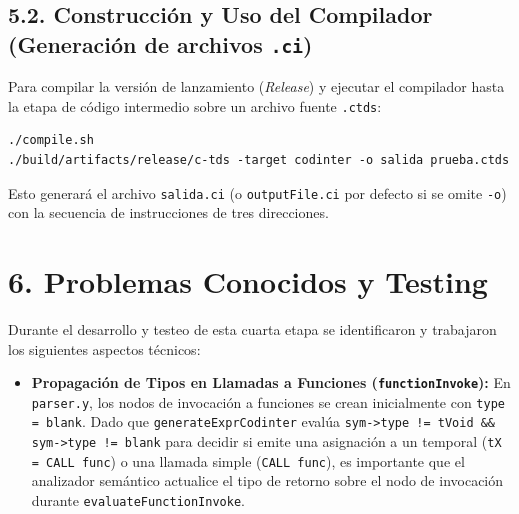 \documentclass[12pt, a4paper]{article}
\begin{document}
\subsection*{5.2. Construcción y Uso del Compilador (Generación de archivos \texttt{.ci})}
Para compilar la versión de lanzamiento (\textit{Release}) y ejecutar el compilador hasta la etapa de código intermedio sobre un archivo fuente \texttt{.ctds}:
\begin{verbatim}
./compile.sh
./build/artifacts/release/c-tds -target codinter -o salida prueba.ctds
\end{verbatim}
Esto generará el archivo \texttt{salida.ci} (o \texttt{outputFile.ci} por defecto si se omite \texttt{-o}) con la secuencia de instrucciones de tres direcciones.

\section{6. Problemas Conocidos y Testing}
Durante el desarrollo y testeo de esta cuarta etapa se identificaron y trabajaron los siguientes aspectos técnicos:

\begin{itemize}
    \item \textbf{Propagación de Tipos en Llamadas a Funciones (\texttt{functionInvoke}):} En \texttt{parser.y}, los nodos de invocación a funciones se crean inicialmente con \texttt{type = blank}. Dado que \texttt{generateExprCodinter} evalúa \texttt{sym->type != tVoid \&\& sym->type != blank} para decidir si emite una asignación a un temporal (\texttt{tX = CALL func}) o una llamada simple (\texttt{CALL func}), es importante que el analizador semántico actualice el tipo de retorno sobre el nodo de invocación durante \texttt{evaluateFunctionInvoke}.
\end{itemize}
\end{document}
